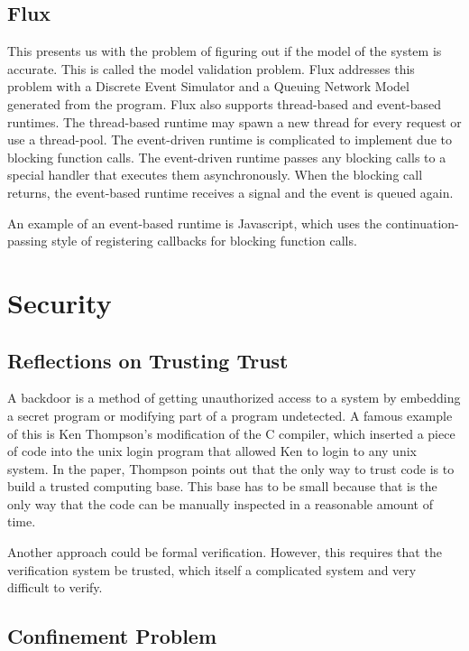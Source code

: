 \documentclass[twoside]{article}
\begin{document}
\subsection{Flux}

This presents us with the problem of figuring out if the model of the system is accurate. This is called the model validation problem. Flux addresses this problem with a Discrete Event Simulator and a Queuing Network Model generated from the program. 
Flux also supports thread-based and event-based runtimes. The thread-based runtime may spawn a new thread for every request or use a thread-pool. The event-driven runtime is complicated to implement due to blocking function calls. The event-driven runtime passes any blocking calls to a special handler that executes them asynchronously. When the blocking call returns, the event-based runtime receives a signal and the event is queued again. 

An example of an event-based runtime is Javascript, which uses the continuation-passing style of registering callbacks for blocking function calls.

\section{Security}

\subsection{Reflections on Trusting Trust}

A backdoor is a method of getting unauthorized access to a system by embedding a secret program or modifying part of a program undetected. A famous example of this is Ken Thompson's modification of the C compiler, which inserted a piece of code into the unix login program that allowed Ken to login to any unix system. 
In the paper, Thompson points out that the only way to trust code is to build a trusted computing base. This base has to be small because that is the only way that the code can be manually inspected in a reasonable amount of time. 

Another approach could be formal verification. However, this requires that the verification system be trusted, which itself a complicated system and very difficult to verify.

\subsection{Confinement Problem}
\end{document}
